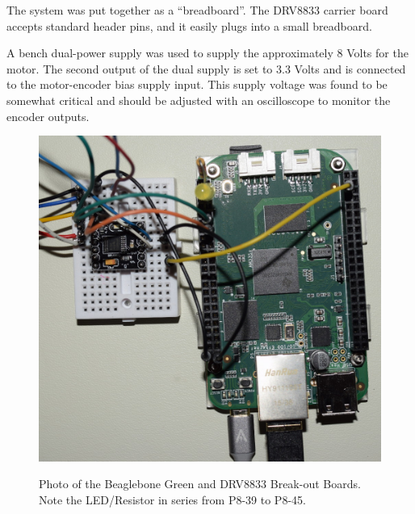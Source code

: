 The system was put together as a ``breadboard''.  The DRV8833 carrier board accepts standard header pins, and it easily plugs into a small breadboard.

A bench dual-power supply was used to supply the approximately 8 Volts for the motor.  The second output of the dual supply is set to 3.3 Volts and is connected to the motor-encoder bias supply input.  This supply voltage was found to be somewhat critical and should be adjusted with an oscilloscope to monitor the encoder outputs.

\begin{figure}[H]
	\centering
	\includegraphics[width=1.0\textwidth]{photos/top_view.jpg}
	\centering\bfseries
	\caption{Photo of the Beaglebone Green and DRV8833 Break-out Boards.  Note the LED/Resistor in series from P8-39 to P8-45.}
\end{figure}






